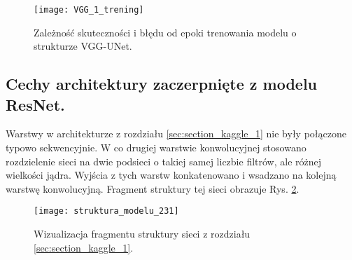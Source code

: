 {\begin{figure}[h!]
	\centering
	\centering
		\texttt{[image: VGG\_1\_trening]}	
	\caption{Zależność skuteczności i błędu od epoki trenowania modelu o strukturze VGG-UNet.}
	\label{fig:VGG_1_trening}
\end{figure}
}

\subsection{Cechy architektury zaczerpnięte z modelu ResNet.}
\label{sec:architektura_resnet}

Warstwy w architekturze z rozdziału \ref{sec:section_kaggle_1} nie były połączone typowo sekwencyjnie. W co drugiej warstwie konwolucyjnej stosowano rozdzielenie sieci na dwie podsieci o takiej samej liczbie filtrów, ale różnej wielkości jądra. Wyjścia z tych warstw konkatenowano i wsadzano na kolejną warstwę konwolucyjną. Fragment struktury tej sieci obrazuje Rys. \ref{fig:struktura_modelu_231}. 


\begin{figure}[h!]
	\centering
	\centering
		\texttt{[image: struktura\_modelu\_231]}	
	\caption{Wizualizacja fragmentu struktury sieci z rozdziału \ref{sec:section_kaggle_1}.}	\label{fig:struktura_modelu_231}
\end{figure}

